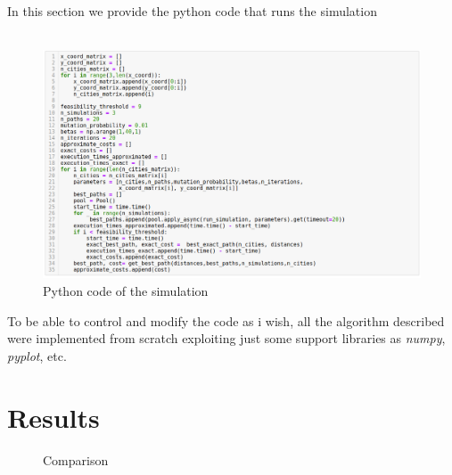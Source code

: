 \documentclass{article}
\begin{document}
\noindent In this section we provide the python code that runs the simulation\\
\\
\begin{figure}[H]
\includegraphics[scale=0.5]{simulation.png} 
\centering
\caption{Python code of the simulation}
\end{figure}

\noindent To be able to control and modify the code as i wish, all the algorithm described were implemented from scratch exploiting just some support libraries as \textit{numpy}, \textit{pyplot}, etc.
\section{Results}

\begin{figure}[H]
\begin{adjustwidth}{-4em}{-4em}

     \hfill
     
     \caption{Comparison}
    \end{adjustwidth}
   \end{figure}
   
\end{document}

